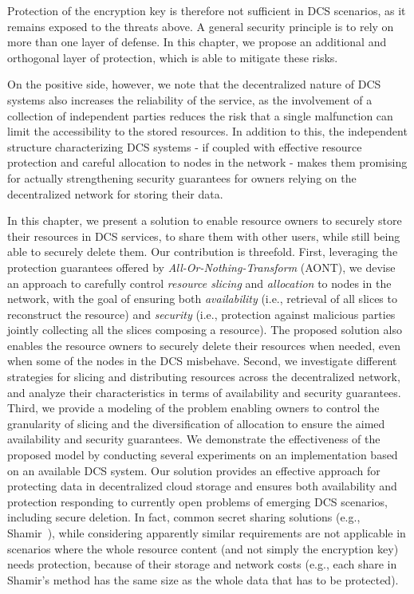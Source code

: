Protection of the encryption key is therefore not sufficient in DCS
scenarios, as it remains exposed to the threats above. A general
security principle is to rely on more than one layer of defense.  In
this chapter, we propose an additional and orthogonal layer of
protection, which is able to mitigate these risks.

On the positive side, however, we note that the decentralized nature
of DCS systems also increases the reliability of the service, as the
involvement of a collection of independent parties reduces the risk
that a single malfunction can limit the accessibility to the stored
resources. In addition to this, the independent structure
characterizing DCS systems - if coupled with effective resource
protection and careful allocation to nodes in the network - makes them
promising for actually strengthening security guarantees for owners
relying on the decentralized network for storing their data.

In this chapter, we present a solution to enable resource owners to
securely store their resources in DCS services, to share them with
other users, while still being able to securely delete them. Our
contribution is threefold. First, leveraging the protection guarantees
offered by {\em All-Or-Nothing-Transform\/} (AONT), we devise an
approach to carefully control {\em resource slicing\/} and {\em
  allocation\/} to nodes in the network, with the goal of ensuring
both {\em availability} (i.e., retrieval of all slices to reconstruct
the resource) and {\em security} (i.e., protection against malicious
parties jointly collecting all the slices composing a resource). The
proposed solution also enables the resource owners to securely delete
their resources when needed, even when some of the nodes in the DCS
misbehave.  Second, we investigate different strategies for slicing
and distributing resources across the decentralized network, and
analyze their characteristics in terms of availability and security
guarantees. Third, we provide a modeling of the problem enabling
owners to control the granularity of slicing and the diversification
of allocation to ensure the aimed availability and security
guarantees. We demonstrate the effectiveness of the proposed model by
conducting several experiments on an implementation based on an
available DCS system.  Our solution provides an effective approach for
protecting data in decentralized cloud storage and ensures both
availability and protection responding to currently open problems of
emerging DCS scenarios, including secure deletion. In fact, common
secret sharing solutions (e.g., Shamir~\cite{shamir1979share}), while
considering apparently similar requirements are not applicable in
scenarios where the whole resource content (and not simply the
encryption key) needs protection, because of their storage and network
costs (e.g., each share in Shamir's method has the same size as the
whole data that has to be protected).

